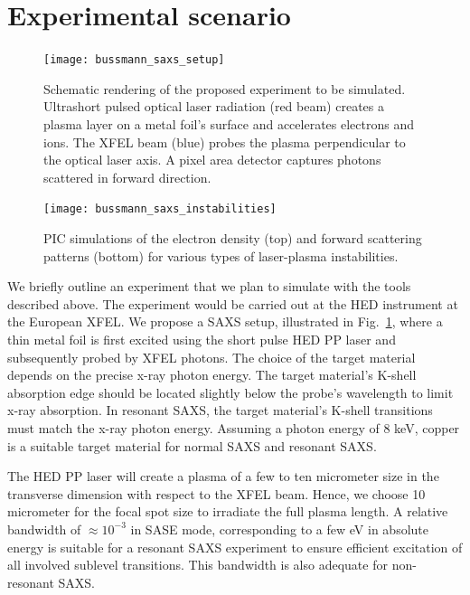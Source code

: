 \documentclass[10pt]{scrartcl}
\begin{document}
\section{Experimental scenario}
%
\begin{figure}[ht]
  \begin{center}
    \texttt{[image: bussmann\_saxs\_setup]}
  \end{center}
  \caption{Schematic rendering of the proposed experiment to be simulated.
  Ultrashort pulsed optical laser radiation (red beam) creates a plasma layer on
a metal foil's surface and accelerates electrons and ions. The XFEL beam (blue)
probes the plasma perpendicular to the optical laser axis. A pixel area detector
captures photons scattered in forward direction.}
  \label{fig:xfel-saxs_setup}
\end{figure}
%
\begin{figure}[ht]
  \begin{center}
    \texttt{[image: bussmann\_saxs\_instabilities]}
  \end{center}
  \caption{PIC simulations of the electron density (top) and forward scattering
    patterns (bottom) for various
  types of laser-plasma instabilities.}
  \label{fig:saxs_instabilities}
\end{figure}

We briefly outline an experiment that we plan to simulate with
the tools described above. The experiment would be carried out at the HED
instrument at the European XFEL. We propose a SAXS setup, illustrated in
Fig.~\ref{fig:xfel-saxs_setup}, where a thin metal foil is
first excited using the short pulse HED PP laser and subsequently probed by XFEL
photons.
The choice of the target material depends on the precise x-ray photon energy.
The target material's K-shell absorption edge should be located slightly
below the probe's wavelength to limit x-ray absorption. In resonant
SAXS, the target material's K-shell transitions must match the x-ray photon
energy. Assuming a photon energy of 8 keV, copper is a suitable target material
for normal SAXS and resonant SAXS.

The HED PP laser will
create a plasma of a few to ten micrometer size in the transverse dimension with
respect to the XFEL beam. Hence, we choose 10 micrometer for the focal spot size
to irradiate the full plasma length. A relative bandwidth of
$\approx 10^{-3}$ in SASE mode, corresponding to a few eV in absolute energy is
suitable for a resonant SAXS experiment to ensure efficient excitation of all
involved sublevel transitions. This bandwidth is also adequate for non-resonant SAXS.
\end{document}
